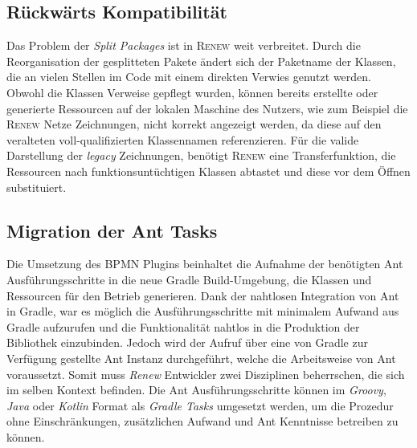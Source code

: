  \subsection{Rückwärts Kompatibilität}
	Das Problem der \textit{Split Packages} ist in \textsc{Renew} weit verbreitet. Durch die Reorganisation der gesplitteten Pakete ändert sich der Paketname der Klassen, die an vielen Stellen im Code mit einem direkten Verwies genutzt werden. Obwohl die Klassen Verweise gepflegt wurden, können bereits erstellte oder generierte Ressourcen auf der lokalen Maschine des Nutzers, wie zum Beispiel die \textsc{Renew} Netze Zeichnungen, nicht korrekt angezeigt werden, da diese auf den veralteten voll-qualifizierten Klassennamen referenzieren.\newline
	Für die valide Darstellung der \textit{legacy} Zeichnungen, benötigt \textsc{Renew} eine Transferfunktion, die Ressourcen nach funktionsuntüchtigen Klassen abtastet und diese vor dem Öffnen substituiert.
	
 \subsection{Migration der Ant Tasks}
	Die Umsetzung des BPMN Plugins beinhaltet die Aufnahme der benötigten Ant Ausführungsschritte in die neue Gradle Build-Umgebung, die Klassen und Ressourcen für den Betrieb generieren. Dank der nahtlosen Integration von Ant in Gradle, war es möglich die Ausführungsschritte mit minimalem Aufwand aus Gradle aufzurufen und die Funktionalität nahtlos in die Produktion der Bibliothek einzubinden. Jedoch wird der Aufruf über eine von Gradle zur Verfügung gestellte Ant Instanz durchgeführt, welche die Arbeitsweise von Ant voraussetzt. Somit muss \textit{Renew} Entwickler zwei Disziplinen beherrschen, die sich im selben Kontext befinden.\newline
	Die Ant Ausführungsschritte können im \textit{Groovy}, \textit{Java} oder \textit{Kotlin} Format als \textit{Gradle Tasks} umgesetzt werden, um die Prozedur ohne Einschränkungen, zusätzlichen Aufwand und Ant Kenntnisse betreiben zu können. 
	
